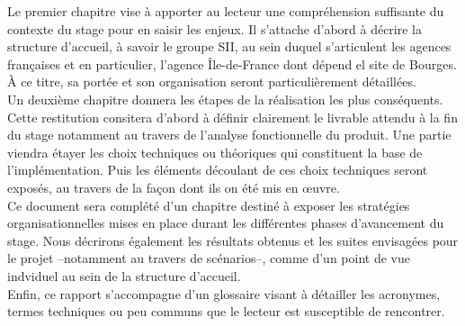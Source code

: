 Le premier chapitre vise à apporter au lecteur une compréhension suffisante du contexte du stage pour en saisir les enjeux. 
Il s'attache d'abord à décrire la structure d'accueil, à savoir le groupe \gls{SII}, au sein duquel s'articulent les agences françaises et en particulier, l'agence \^{I}le-de-France
dont dépend el site de Bourges. 
\`{A} ce titre, sa portée et son organisation seront particulièrement détaillées. \\
Un deuxième chapitre donnera les étapes de la réalisation les plus conséquents. 
Cette restitution consitera d'abord à définir clairement le livrable attendu à la fin du stage notamment au travers de l'analyse fonctionnelle du produit.
Une partie viendra étayer les choix techniques ou théoriques qui constituent la base de l'implémentation. 
Puis les éléments découlant de ces choix techniques seront exposés, au travers de la façon dont ils on été mis en \oe{}uvre. \\
Ce document sera complété d'un chapitre destiné à exposer les stratégies organisationnelles mises en place durant les différentes phases d'avancement du stage. 
Nous décrirons également les résultats obtenus et les suites envisagées pour le projet --notamment au travers de scénarios--, comme d'un point de vue indviduel au sein de la structure d'accueil. \\
Enfin, ce rapport s'accompagne d'un glossaire visant à détailler les acronymes, termes techniques ou peu communs que le lecteur est susceptible de rencontrer. 